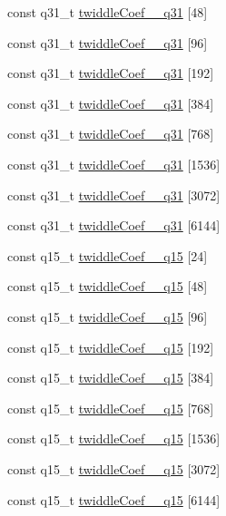 \begin{DoxyCompactItemize}
const q31\+\_\+t \hyperlink{group__CFFT__CIFFT_ga8ba78d5e6ef4bdc58e8f0044e0664a0a}{twiddle\+Coef\+\_\+\_\+q31} \mbox{[}48\mbox{]}
\item 
const q31\+\_\+t \hyperlink{group__CFFT__CIFFT_ga6e0a7e941a25a0d74b2e6590307de47e}{twiddle\+Coef\+\_\+\_\+q31} \mbox{[}96\mbox{]}
\item 
const q31\+\_\+t \hyperlink{group__CFFT__CIFFT_gafecf9ed9873415d9f5f17f37b30c7250}{twiddle\+Coef\+\_\+\_\+q31} \mbox{[}192\mbox{]}
\item 
const q31\+\_\+t \hyperlink{group__CFFT__CIFFT_gaef1ea005053b715b851cf5f908168ede}{twiddle\+Coef\+\_\+\_\+q31} \mbox{[}384\mbox{]}
\item 
const q31\+\_\+t \hyperlink{group__CFFT__CIFFT_ga416c61b2f08542a39111e06b0378bebe}{twiddle\+Coef\+\_\+\_\+q31} \mbox{[}768\mbox{]}
\item 
const q31\+\_\+t \hyperlink{group__CFFT__CIFFT_ga514443c44b62b8b3d240afefebcda310}{twiddle\+Coef\+\_\+\_\+q31} \mbox{[}1536\mbox{]}
\item 
const q31\+\_\+t \hyperlink{group__CFFT__CIFFT_ga9c5767de9f5a409fd0c2027e6ac67179}{twiddle\+Coef\+\_\+\_\+q31} \mbox{[}3072\mbox{]}
\item 
const q31\+\_\+t \hyperlink{group__CFFT__CIFFT_ga67c0890317deab3391e276f22c1fc400}{twiddle\+Coef\+\_\+\_\+q31} \mbox{[}6144\mbox{]}
\item 
const q15\+\_\+t \hyperlink{group__CFFT__CIFFT_ga8e4e2e05f4a3112184c96cb3308d6c39}{twiddle\+Coef\+\_\+\_\+q15} \mbox{[}24\mbox{]}
\item 
const q15\+\_\+t \hyperlink{group__CFFT__CIFFT_gac194a4fe04a19051ae1811f69c6e5df2}{twiddle\+Coef\+\_\+\_\+q15} \mbox{[}48\mbox{]}
\item 
const q15\+\_\+t \hyperlink{group__CFFT__CIFFT_gaa0cc411e0b3c82078e85cfdf1b84290f}{twiddle\+Coef\+\_\+\_\+q15} \mbox{[}96\mbox{]}
\item 
const q15\+\_\+t \hyperlink{group__CFFT__CIFFT_gabfdd1c5cd2b3f96da5fe5f07c707a8e5}{twiddle\+Coef\+\_\+\_\+q15} \mbox{[}192\mbox{]}
\item 
const q15\+\_\+t \hyperlink{group__CFFT__CIFFT_ga6099ae5262a0a3a8d9ce1e6da02f0c2e}{twiddle\+Coef\+\_\+\_\+q15} \mbox{[}384\mbox{]}
\item 
const q15\+\_\+t \hyperlink{group__CFFT__CIFFT_ga6152621af210f847128c6f38958fa385}{twiddle\+Coef\+\_\+\_\+q15} \mbox{[}768\mbox{]}
\item 
const q15\+\_\+t \hyperlink{group__CFFT__CIFFT_ga8a0ec95d866fe96b740e77d6e1356b59}{twiddle\+Coef\+\_\+\_\+q15} \mbox{[}1536\mbox{]}
\item 
const q15\+\_\+t \hyperlink{group__CFFT__CIFFT_gadd16ce08ffd1048c385e0534a3b19cbb}{twiddle\+Coef\+\_\+\_\+q15} \mbox{[}3072\mbox{]}
\item 
const q15\+\_\+t \hyperlink{group__CFFT__CIFFT_ga9b409d6995eab17805b1d1881d4bc652}{twiddle\+Coef\+\_\+\_\+q15} \mbox{[}6144\mbox{]}
\end{DoxyCompactItemize}


